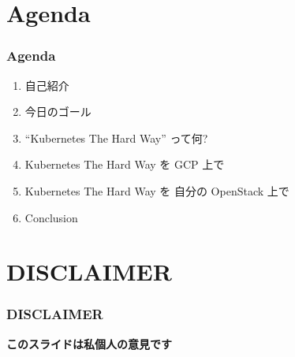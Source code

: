 \documentclass[aspectratio=169,11pt,hyperref={colorlinks=true}]{beamer}
\begin{document}
\section{Agenda}
\begin{frame}
  \frametitle{Agenda}
  \begin{enumerate}
    \item 自己紹介
    \item 今日のゴール
    \item ``Kubernetes The Hard Way'' って何?
    \item Kubernetes The Hard Way を GCP 上で
    \item Kubernetes The Hard Way を 自分の OpenStack 上で
    \item Conclusion
  \end{enumerate}
\end{frame}

\section{DISCLAIMER}
\begin{frame}
  \frametitle{DISCLAIMER}
  \huge{\bf{このスライドは私個人の意見です}}
\end{frame}
\end{document}
